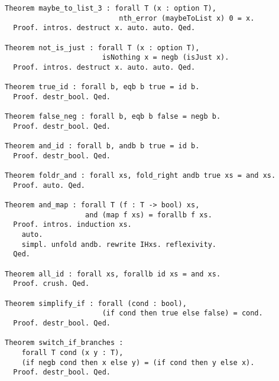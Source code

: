 \begin{verbatim}
Theorem maybe_to_list_3 : forall T (x : option T),
                           nth_error (maybeToList x) 0 = x.
  Proof. intros. destruct x. auto. auto. Qed.

Theorem not_is_just : forall T (x : option T),
                       isNothing x = negb (isJust x).
  Proof. intros. destruct x. auto. auto. Qed.

Theorem true_id : forall b, eqb b true = id b.
  Proof. destr_bool. Qed.

Theorem false_neg : forall b, eqb b false = negb b.
  Proof. destr_bool. Qed.

Theorem and_id : forall b, andb b true = id b.
  Proof. destr_bool. Qed.

Theorem foldr_and : forall xs, fold_right andb true xs = and xs.
  Proof. auto. Qed.

Theorem and_map : forall T (f : T -> bool) xs,
                   and (map f xs) = forallb f xs.
  Proof. intros. induction xs.
    auto.
    simpl. unfold andb. rewrite IHxs. reflexivity.
  Qed.

Theorem all_id : forall xs, forallb id xs = and xs.
  Proof. crush. Qed.

Theorem simplify_if : forall (cond : bool),
                       (if cond then true else false) = cond.
  Proof. destr_bool. Qed.

Theorem switch_if_branches :
    forall T cond (x y : T),
    (if negb cond then x else y) = (if cond then y else x).
  Proof. destr_bool. Qed.
\end{verbatim}
